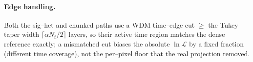 \documentclass[11pt]{article}
\newcommand{\Nt}{N_t}
\begin{document}
\paragraph{Edge handling.} Both the sig--het and chunked paths use a WDM
time--edge cut $\ge$ the Tukey taper width $\lceil\alpha\Nt/2\rceil$ layers, so
their active time region matches the dense reference exactly; a mismatched cut
biases the absolute $\ln\mathcal L$ by a fixed fraction (different time
coverage), not the per--pixel floor that the real projection removed.
\end{document}
